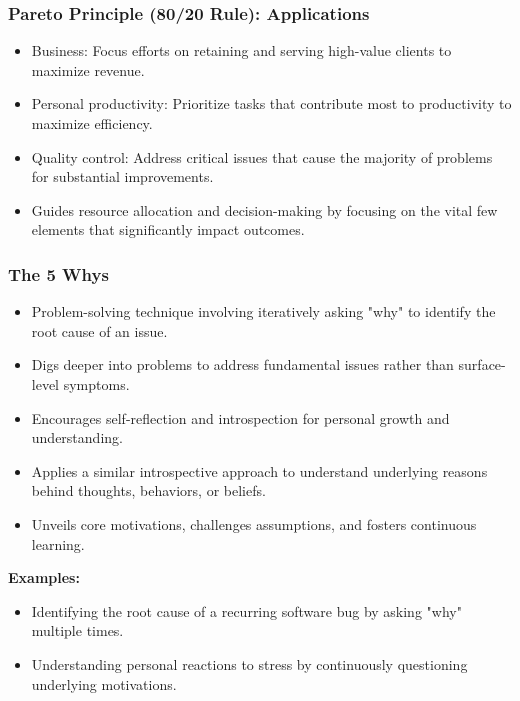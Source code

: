 \begin{frame}[fragile]\frametitle{Pareto Principle (80/20 Rule): Applications}
\begin{itemize}
    \item Business: Focus efforts on retaining and serving high-value clients to maximize revenue.
    \item Personal productivity: Prioritize tasks that contribute most to productivity to maximize efficiency.
    \item Quality control: Address critical issues that cause the majority of problems for substantial improvements.
    \item Guides resource allocation and decision-making by focusing on the vital few elements that significantly impact outcomes.
\end{itemize}
\end{frame}

\begin{frame}[fragile]\frametitle{The 5 Whys}
\begin{itemize}
    \item Problem-solving technique involving iteratively asking "why" to identify the root cause of an issue.
    \item Digs deeper into problems to address fundamental issues rather than surface-level symptoms.
    \item Encourages self-reflection and introspection for personal growth and understanding.
    \item Applies a similar introspective approach to understand underlying reasons behind thoughts, behaviors, or beliefs.
    \item Unveils core motivations, challenges assumptions, and fosters continuous learning.
\end{itemize}
\textbf{Examples:}
\begin{itemize}
    \item Identifying the root cause of a recurring software bug by asking "why" multiple times.
    \item Understanding personal reactions to stress by continuously questioning underlying motivations.
\end{itemize}
\end{frame}


